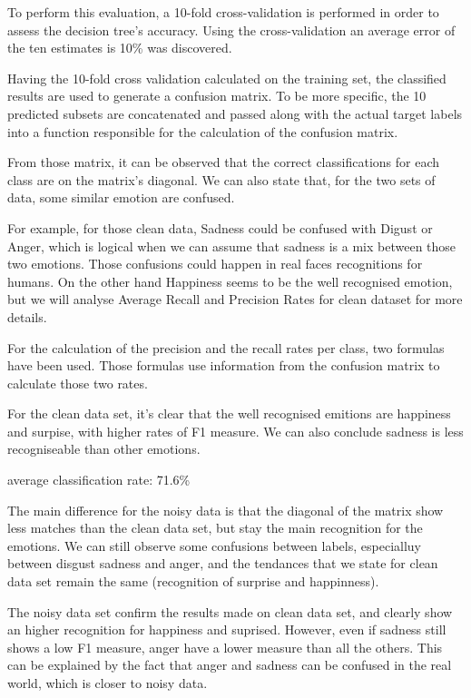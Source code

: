 To perform this evaluation, a 10-fold cross-validation is performed in order to assess the decision tree’s accuracy.
Using the cross-validation an average error of the ten estimates is 10\% was discovered.

Having the 10-fold cross validation calculated on the training set, the classified results
are used to generate a confusion matrix.
To be more specific, the 10 predicted subsets are concatenated
and passed along with the actual target labels into a function responsible for the calculation of the confusion matrix.

From those matrix, it can be observed that the correct classifications for each class are on the matrix’s diagonal.
We can also state that, for the two sets of data, some similar emotion are confused.



For example, for those clean data, Sadness could be confused with Digust or Anger, which is logical when we can assume that sadness is a mix between those two emotions. 
Those confusions could happen in real faces recognitions for humans.
On the other hand Happiness seems to be the well recognised emotion, but we will
analyse Average Recall and Precision Rates for clean dataset for more details. 




For the calculation of the precision and the recall rates per class, two formulas have been used.
Those formulas use information from the confusion matrix to calculate those two rates.

For the clean data set, it's clear that the well recognised emitions are happiness and surpise, with higher rates of F1 measure. 
We can also conclude sadness is less recogniseable than other emotions.


average classification rate:
71.6\%
 


The main difference for the noisy data is that the diagonal of the matrix show less matches than the clean data set, but stay the main recognition for the emotions.
We can still observe some confusions between labels, especialluy between disgust sadness and anger, and the tendances that we state for clean data set remain the same (recognition of surprise and happinness).




The noisy data set confirm the results made on clean data set, and clearly show an higher recognition for happiness and suprised. However, even if sadness still shows a low F1 measure, anger have a lower measure than all the others. This can be explained by the fact that anger and sadness can be confused in the real world, which is closer to noisy data. 


